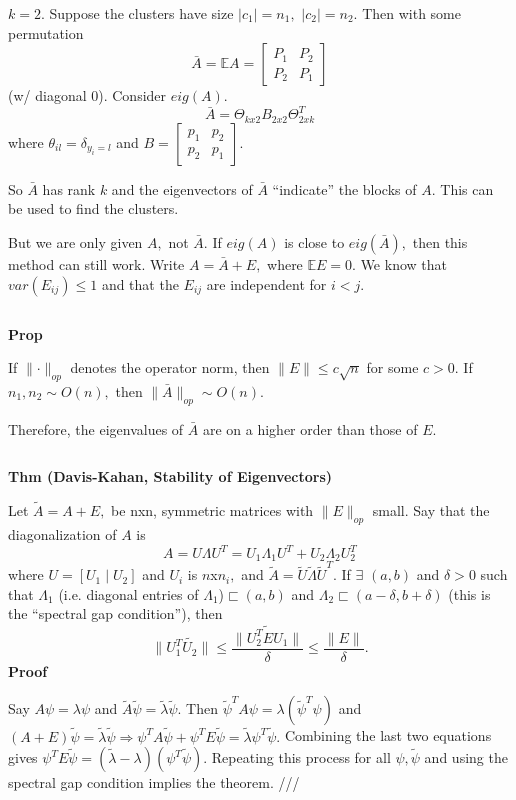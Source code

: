 \documentclass[english]{article}
\begin{document}
$k=2.$ Suppose the clusters have size $\mid c_{1}\mid=n_{1},$ $\mid c_{2}\mid=n_{2}.$
Then with some permutation
\[
\bar{A}=\mathbb{E}A=\left[\begin{array}{cc}
P_{1} & P_{2}\\
P_{2} & P_{1}
\end{array}\right]
\]
 (w/ diagonal $0$). Consider $eig(A).$ 
\[
\bar{A}=\Theta_{kx2}B_{2x2}\Theta_{2xk}^{T}
\]
 where $\theta_{il}=\delta_{y_{i}=l}$ and $B=\left[\begin{array}{cc}
p_{1} & p_{2}\\
p_{2} & p_{1}
\end{array}\right].$ 

So $\bar{A}$ has rank $k$ and the eigenvectors of $\bar{A}$ ``indicate''
the blocks of $A.$ This can be used to find the clusters. 

But we are only given $A,$ not $\bar{A}.$ If $eig(A)$ is close
to $eig(\bar{A}),$ then this method can still work. Write $A=\bar{A}+E,$
where $\mathbb{E}E=0.$ We know that $var(E_{ij})\leq1$ and that
the $E_{ij}$ are independent for $i<j.$ 

$\,$

\textbf{Prop }

If $\parallel\cdot\parallel_{op}$ denotes the operator norm, then
$\parallel E\parallel\leq c\sqrt{n}$ for some $c>0.$ If $n_{1},n_{2}\sim O(n),$
then $\parallel\bar{A}\parallel_{op}\sim O(n).$ 

Therefore, the eigenvalues of $\bar{A}$ are on a higher order than
those of $E.$ 

$\,$

\textbf{Thm (Davis-Kahan, Stability of Eigenvectors) }

Let $\tilde{A}=A+E,$ be nxn, symmetric matrices with $\parallel E\parallel_{op}$
small. Say that the diagonalization of $A$ is 
\[
A=U\Lambda U^{T}=U_{1}\Lambda_{1}U^{T}+U_{2}\Lambda_{2}U_{2}^{T}
\]
 where $U=[U_{1}\mid U_{2}]$ and $U_{i}$ is $n$x$n_{i},$ and $\tilde{A}=\tilde{U}\tilde{\Lambda}\tilde{U}^{T}.$
If $\exists$ $(a,b)$ and $\delta>0$ such that $\Lambda_{1}$ (i.e.
diagonal entries of $\Lambda_{1}$)$\sqsubset(a,b)$ and $\Lambda_{2}\sqsubset(a-\delta,b+\delta)$
(this is the ``spectral gap condition''), then 
\[
\parallel U_{1}^{T}\tilde{U_{2}}\parallel\leq\frac{\parallel\tilde{U_{2}^{T}EU_{1}}\parallel}{\delta}\leq\frac{\parallel E\parallel}{\delta}.
\]
 \textbf{Proof}

Say $A\psi=\lambda\psi$ and $\tilde{A}\tilde{\psi}=\tilde{\lambda}\tilde{\psi}.$
Then $\tilde{\psi}^{T}A\psi=\lambda(\tilde{\psi}^{T}\psi)$ and $(A+E)\tilde{\psi}=\tilde{\lambda}\tilde{\psi}\Rightarrow\psi^{T}A\tilde{\psi}+\psi^{T}E\tilde{\psi}=\tilde{\lambda}\psi^{T}\tilde{\psi}.$
Combining the last two equations gives $\psi^{T}E\tilde{\psi}=(\tilde{\lambda}-\lambda)(\psi^{T}\tilde{\psi}).$
Repeating this process for all $\psi,\tilde{\psi}$ and using the
spectral gap condition implies the theorem. ///
\end{document}
